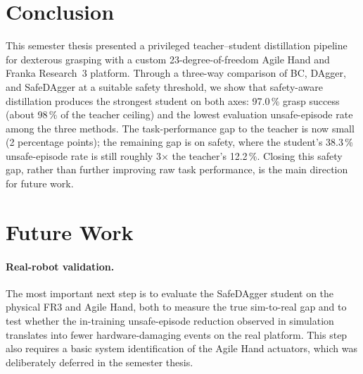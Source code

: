 \section{Conclusion}%
\label{sec:conclusion_sec}%

This semester thesis presented a privileged teacher--student distillation pipeline for dexterous grasping with a custom 23-degree-of-freedom Agile Hand and Franka Research~3 platform.
Through a three-way comparison of BC, DAgger, and SafeDAgger at a suitable safety threshold, we show that safety-aware distillation produces the strongest student on both axes: 97.0\,\% grasp success (about 98\,\% of the teacher ceiling) and the lowest evaluation unsafe-episode rate among the three methods.
The task-performance gap to the teacher is now small (2 percentage points); the remaining gap is on safety, where the student's 38.3\,\% unsafe-episode rate is still roughly 3$\times$ the teacher's 12.2\,\%.
Closing this safety gap, rather than further improving raw task performance, is the main direction for future work.

\section{Future Work}%
\label{sec:future_work}%

\paragraph{Real-robot validation.}
The most important next step is to evaluate the SafeDAgger student on the physical FR3 and Agile Hand, both to measure the true sim-to-real gap and to test whether the in-training unsafe-episode reduction observed in simulation translates into fewer hardware-damaging events on the real platform.
This step also requires a basic system identification of the Agile Hand actuators, which was deliberately deferred in the semester thesis.

